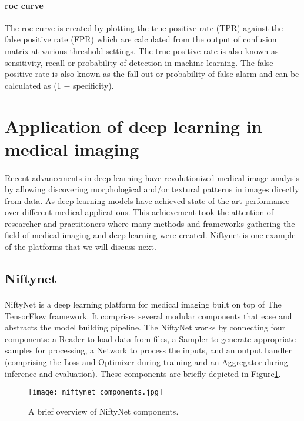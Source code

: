 \paragraph{\acs{roc} curve}
The \acs{roc} curve is created by plotting the true positive rate (TPR) against the false positive rate (FPR) which are calculated from the output of confusion matrix at various threshold settings. The true-positive rate is also known as sensitivity, recall or probability of detection in machine learning. The false-positive rate is also known as the fall-out or probability of false alarm and can be calculated as (1 − specificity).
\section{Application of deep learning in medical imaging}
\paragraph{}
Recent advancements in deep learning have revolutionized medical image analysis by allowing discovering morphological and/or textural patterns in images directly from data. As deep learning models have achieved state of the art performance over different medical applications. This achievement took the attention of researcher and practitioners where many methods and frameworks gathering the field of medical imaging and deep learning were created. Niftynet is one example of the platforms that we will discuss next.
\subsection{Niftynet}
\paragraph{}
NiftyNet is a deep learning platform for medical imaging built on top of The TensorFlow framework\cite{tensorflow}. It comprises several modular components that ease and abstracts the model building pipeline. The NiftyNet works by connecting four components: a Reader to load data from files, a Sampler to generate appropriate samples for processing, a Network to process the inputs, and an output handler (comprising the Loss and Optimizer during training and an Aggregator during inference and evaluation). These components are briefly depicted in Figure\ref{niftynet_components}.\cite{niftyNet}
\begin{figure}[h]
 \texttt{[image: niftynet\_components.jpg]}
 \centering         
 \caption{A brief overview of NiftyNet components\cite{niftyNet}.}
 \label{niftynet_components}
\end{figure}

